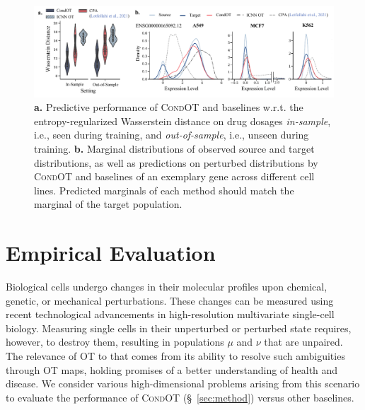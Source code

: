 \begin{figure}
    \centering
    \includegraphics[width=\textwidth]{figures/fig_sciplex_main_results.pdf}
    \caption{\textbf{a.}  Predictive performance of \textsc{CondOT} and baselines w.r.t. the entropy-regularized Wasserstein distance on drug dosages \emph{in-sample}, i.e., seen during training, and \emph{out-of-sample}, i.e., unseen during training. \textbf{b.} Marginal distributions of observed source and target distributions, as well as predictions on perturbed distributions by \textsc{CondOT} and baselines of an exemplary gene across different cell lines. Predicted marginals of each method should match the marginal of the target population.}
    \label{fig:exp_scalar_sciplex}
\end{figure}

\vspace{-5pt}
\section{Empirical Evaluation} \label{sec:evaluation_condot}
\vspace{-5pt}

 Biological cells undergo changes in their molecular profiles upon chemical, genetic, or mechanical perturbations. These changes can be measured using recent technological advancements in high-resolution multivariate single-cell biology. Measuring single cells in their unperturbed or perturbed state requires, however, to destroy them, resulting in populations $\mu$ and $\nu$ that are unpaired. The relevance of OT to that comes from its ability to resolve such ambiguities through OT maps, 
holding promises of a better understanding of health and disease. 
We consider various high-dimensional problems arising from this scenario to evaluate the performance of \textsc{CondOT} (\S~\ref{sec:method}) versus other baselines.


